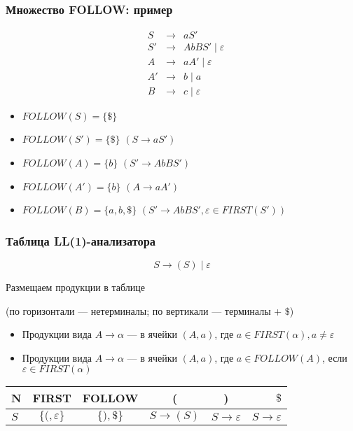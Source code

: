 \documentclass{beamer}
\begin{document}
\begin{frame}[fragile]
  \transwipe[direction=90]
  \frametitle{Множество FOLLOW: пример}
  \[
  \begin{array}{crcl}
  &S  & \to & a S' \\

  &S' & \to & A b B S' \mid \varepsilon \\

  &A  & \to & a A' \mid \varepsilon \\
  &A' & \to & b \mid a \\
  &B  & \to & c \mid \varepsilon
  \end{array}
  \] \pause

  \begin{itemize}
    \item $FOLLOW(S) = \{ \$ \}$ \pause
    \item $FOLLOW(S') = \{ \$ \}$ \hfill $(S \to a S')$  \pause
    \item $FOLLOW(A) = \{ b \}$ \hfill $(S' \to A b B S')$ \pause
    \item $FOLLOW(A') = \{ b \}$ \hfill $(A \to a A')$ \pause
    \item $FOLLOW(B) = \{ a, b, \$ \}$ \hfill $(S' \to A b B S', \varepsilon \in FIRST(S'))$
  \end{itemize}
\end{frame}

\begin{frame}[fragile]
  \transwipe[direction=90]
  \frametitle{Таблица LL(1)-анализатора}
  \[
  S \to ( S ) \mid \varepsilon
  \]

\vfill

  \begin{center}
    Размещаем продукции в таблице

    (по горизонтали --- нетерминалы; по вертикали --- терминалы + $\$ $)
  \end{center}

  \begin{itemize}
    \item Продукции вида $A \to \alpha$ --- в ячейки $(A, a)$, где $a \in FIRST(\alpha), a \neq \varepsilon$
    \item Продукции вида $A \to \alpha$ --- в ячейки $(A, a)$, где $a \in FOLLOW(A)$, если $\varepsilon \in FIRST(\alpha)$
  \end{itemize}

  \vfill

\begin{center}
\begin{tabular}{ l || c | c || c | c | r }
  N & FIRST & FOLLOW & ( & ) & $\$ $ \\ \hline
  $S$ & \pause $\{ (, \varepsilon \}$ & $\{ ), \$ \}$ & \pause $S \to (S)$ & \pause $S \to \varepsilon$ & $S \to \varepsilon$
\end{tabular}
\end{center}
\end{frame}
\end{document}
